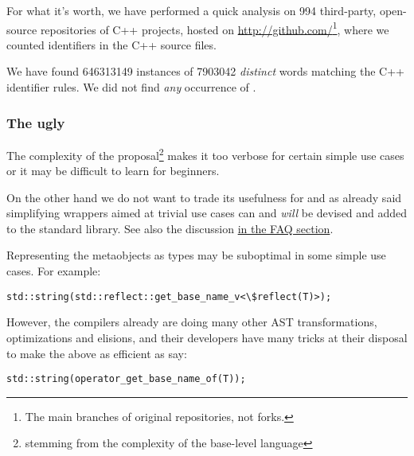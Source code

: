 For what it's worth, we have performed a quick analysis on \num{994} third-party,
open-source repositories of C++ projects, hosted on
\url{http://github.com/}\footnote{The main branches of original repositories,
not forks.}, where we counted identifiers in the C++ source files.

We have found \num{646313149} instances of \num{7903042} {\em distinct} words
matching the C++ identifier rules.  We did not find {\em any} occurrence of
.

\subsubsection{The ugly}

The complexity of the proposal\footnote{stemming from the complexity of the
base-level language} makes it too verbose for certain simple use cases
or it may be difficult to learn for beginners.

On the other hand we do not want to trade its usefulness for 
and as already said simplifying wrappers aimed at trivial use cases can 
and {\em will} be devised and added to the standard library.
See also the discussion \hyperref[faq-hard-on-novices]{in the FAQ section}.

Representing the metaobjects as types may be suboptimal in some simple
use cases. For example:

\begin{verbatim}
std::string(std::reflect::get_base_name_v<\$reflect(T)>);
\end{verbatim}

However, the compilers already are doing many other AST transformations,
optimizations and elisions, and their developers have many tricks at their
disposal to make the above as efficient as say:

\begin{verbatim}
std::string(operator_get_base_name_of(T));
\end{verbatim}

